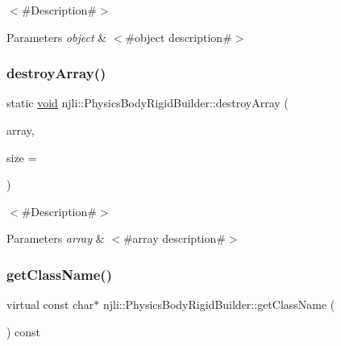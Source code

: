 $<$\#\+Description\#$>$


\begin{DoxyParams}{Parameters}
{\em object} & $<$\#object description\#$>$ \\
\hline
\end{DoxyParams}
\mbox{\label{classnjli_1_1_physics_body_rigid_builder_a6ffac3801a48f17edaeec435e0fb4c20}} 
\subsubsection{\texorpdfstring{destroy\+Array()}{destroyArray()}}
{\footnotesize\ttfamily static \mbox{\hyperlink{_thread_8h_af1e856da2e658414cb2456cb6f7ebc66}{void}} njli\+::\+Physics\+Body\+Rigid\+Builder\+::destroy\+Array (\begin{DoxyParamCaption}\item[{\mbox{\hyperlink{classnjli_1_1_physics_body_rigid_builder}{Physics\+Body\+Rigid\+Builder}} $\ast$$\ast$}]{array,  }\item[{const \mbox{\hyperlink{_util_8h_a10e94b422ef0c20dcdec20d31a1f5049}{u32}}}]{size = {} }\end{DoxyParamCaption})\hspace{0.3cm}{\ttfamily [static]}}

$<$\#\+Description\#$>$


\begin{DoxyParams}{Parameters}
{\em array} & $<$\#array description\#$>$ \\
\hline
\end{DoxyParams}
\mbox{\label{classnjli_1_1_physics_body_rigid_builder_a6a4f7544fc0ad96b952f738854adb076}} 
\subsubsection{\texorpdfstring{get\+Class\+Name()}{getClassName()}}
{\footnotesize\ttfamily virtual const char$\ast$ njli\+::\+Physics\+Body\+Rigid\+Builder\+::get\+Class\+Name (\begin{DoxyParamCaption}{ }\end{DoxyParamCaption}) const\hspace{0.3cm}{\ttfamily [virtual]}}


